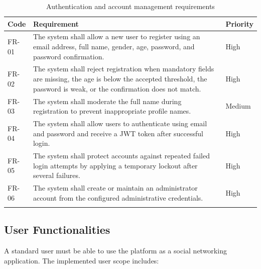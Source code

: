 \begin{longtable}{|m{2.3cm}|m{10.2cm}|m{2.3cm}|}
\hline
\textbf{Code} & \textbf{Requirement} & \textbf{Priority} \\
\hline
FR-01 & The system shall allow a new user to register using an email address, full name, gender, age, password, and password confirmation. & High \\
\hline
FR-02 & The system shall reject registration when mandatory fields are missing, the age is below the accepted threshold, the password is weak, or the confirmation does not match. & High \\
\hline
FR-03 & The system shall moderate the full name during registration to prevent inappropriate profile names. & Medium \\
\hline
FR-04 & The system shall allow users to authenticate using email and password and receive a JWT token after successful login. & High \\
\hline
FR-05 & The system shall protect accounts against repeated failed login attempts by applying a temporary lockout after several failures. & High \\
\hline
FR-06 & The system shall create or maintain an administrator account from the configured administrative credentials. & High \\
\hline
\caption{Authentication and account management requirements}\\
\end{longtable}

\subsection{User Functionalities}

A standard user must be able to use the platform as a social networking application. The implemented user scope includes:

